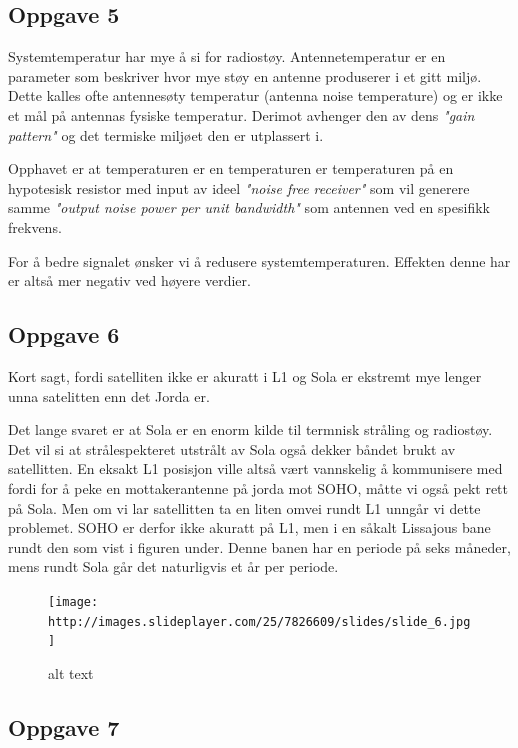 \documentclass[11pt]{article}
\begin{document}
    \subsection{Oppgave 5}\label{oppgave-5}

    Systemtemperatur har mye å si for radiostøy. Antennetemperatur er en
parameter som beskriver hvor mye støy en antenne produserer i et gitt
miljø. Dette kalles ofte antennesøty temperatur (antenna noise
temperature) og er ikke et mål på antennas fysiske temperatur. Derimot
avhenger den av dens \emph{"gain pattern"} og det termiske miljøet den
er utplassert i.

Opphavet er at temperaturen er en temperaturen er temperaturen på en
hypotesisk resistor med input av ideel \emph{"noise free receiver"} som
vil generere samme \emph{"output noise power per unit bandwidth"} som
antennen ved en spesifikk frekvens.

For å bedre signalet ønsker vi å redusere systemtemperaturen. Effekten
denne har er altså mer negativ ved høyere verdier.

    \subsection{Oppgave 6}\label{oppgave-6}

    Kort sagt, fordi satelliten ikke er akuratt i L1 og Sola er ekstremt mye
lenger unna satelitten enn det Jorda er.

Det lange svaret er at Sola er en enorm kilde til termnisk stråling og
radiostøy. Det vil si at strålespekteret utstrålt av Sola også dekker
båndet brukt av satellitten. En eksakt L1 posisjon ville altså vært
vannskelig å kommunisere med fordi for å peke en mottakerantenne på
jorda mot SOHO, måtte vi også pekt rett på Sola. Men om vi lar
satellitten ta en liten omvei rundt L1 unngår vi dette problemet. SOHO
er derfor ikke akuratt på L1, men i en såkalt Lissajous bane rundt den
som vist i figuren under. Denne banen har en periode på seks måneder,
mens rundt Sola går det naturligvis et år per periode.

\begin{figure}[htbp]
\centering
\texttt{[image: http://images.slideplayer.com/25/7826609/slides/slide\_6.jpg]}
\caption{alt text}
\end{figure}

    \subsection{Oppgave 7}\label{oppgave-7}
\end{document}

